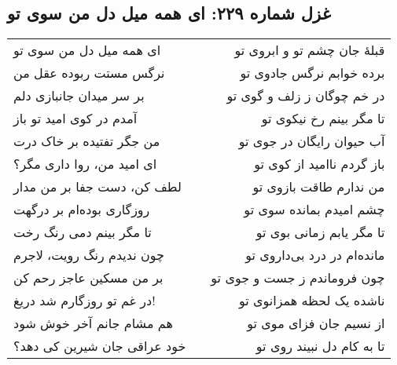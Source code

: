 \begin{center}
\section*{غزل شماره ۲۲۹: ای همه میل دل من سوی تو}
\label{sec:229}
\begin{longtable}{l p{0.5cm} r}
ای همه میل دل من سوی تو
&&
قبلهٔ جان چشم تو و ابروی تو
\\
نرگس مستت ربوده عقل من
&&
برده خوابم نرگس جادوی تو
\\
بر سر میدان جانبازی دلم
&&
در خم چوگان ز زلف و گوی تو
\\
آمدم در کوی امید تو باز
&&
تا مگر بینم رخ نیکوی تو
\\
من جگر تفتیده بر خاک درت
&&
آب حیوان رایگان در جوی تو
\\
ای امید من، روا داری مگر؟
&&
باز گردم ناامید از کوی تو
\\
لطف کن، دست جفا بر من مدار
&&
من ندارم طاقت بازوی تو
\\
روزگاری بوده‌ام بر درگهت
&&
چشم امیدم بمانده سوی تو
\\
تا مگر بینم دمی رنگ رخت
&&
تا مگر یابم زمانی بوی تو
\\
چون ندیدم رنگ رویت، لاجرم
&&
مانده‌ام در درد بی‌داروی تو
\\
بر من مسکین عاجز رحم کن
&&
چون فروماندم ز جست و جوی تو
\\
در غم تو روزگارم شد دریغ!
&&
ناشده یک لحظه همزانوی تو
\\
هم مشام جانم آخر خوش شود
&&
از نسیم جان فزای موی تو
\\
خود عراقی جان شیرین کی دهد؟
&&
تا به کام دل نبیند روی تو
\\
\end{longtable}
\end{center}
